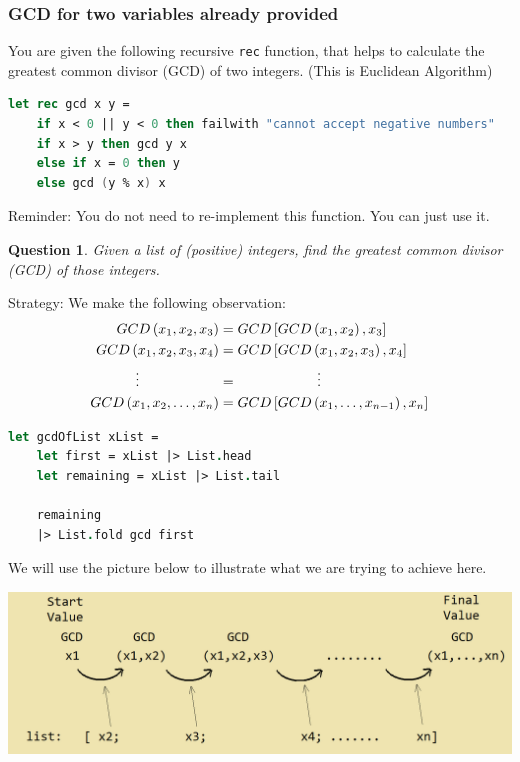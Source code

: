 \documentclass[12pt]{article}
\newtheorem*{question*}{Question}
\begin{document}
\subsubsection*{GCD for two variables already provided}
You are given the following recursive \texttt{rec} function, that helps to calculate the greatest common divisor (GCD) of two integers. (This is Euclidean Algorithm)
\begin{lstlisting}[language=FSharp]
let rec gcd x y =
    if x < 0 || y < 0 then failwith "cannot accept negative numbers"
    if x > y then gcd y x
    else if x = 0 then y
    else gcd (y % x) x
\end{lstlisting}
Reminder: You do not need to re-implement this function. You can just use it.
\begin{question*}
Given a list of (positive) integers, find the greatest common divisor (GCD) of those integers.
\end{question*}
Strategy: We make the following observation:
\begin{align*}
GCD\left(x_1, x_2, x_3\right) &= GCD\left[GCD\left(x_1, x_2\right), x_3\right]
\\GCD\left(x_1, x_2, x_3, x_4\right) &= GCD\left[GCD\left(x_1, x_2, x_3\right), x_4\right]
\\ \vdots \hspace{2.0cm}&= \hspace{2.0cm} \vdots
\\GCD\left(x_1, x_2, \ldots, x_n\right) &= GCD\left[GCD\left(x_1, \ldots, x_{n-1}\right), x_n\right]
\end{align*}
\begin{lstlisting}[language=FSharp]
let gcdOfList xList =
    let first = xList |> List.head
    let remaining = xList |> List.tail

    remaining
    |> List.fold gcd first
\end{lstlisting}
We will use the picture below to illustrate what we are trying to achieve here.
\begin{center}
\includegraphics[width=\textwidth]{pictures/picture36.png}
\end{center}
\end{document}
